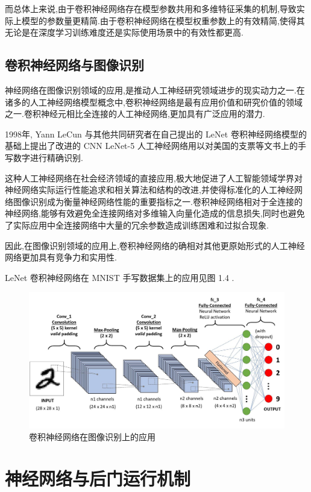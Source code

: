 而总体上来说,由于卷积神经网络存在模型参数共用和多维特征采集的机制,导致实际上模型的参数量更精简.由于卷积神经网络在模型权重参数上的有效精简,使得其无论是在深度学习训练难度还是实际使用场景中的有效性都更高.

\section{卷积神经网络与图像识别}

神经网络在图像识别领域的应用,是推动人工神经研究领域进步的现实动力之一.在诸多的人工神经网络模型概念中,卷积神经网络是最有应用价值和研究价值的领域之一.卷积神经元相比全连接的人工神经网络,更加具有广泛应用的潜力.

1998年, Yann LeCun 与其他共同研究者在自己提出的 LeNet 卷积神经网络模型的基础上提出了改进的 CNN LeNet-5 人工神经网络用以对美国的支票等文书上的手写数字进行精确识别.

这种人工神经网络在社会经济领域的直接应用,极大地促进了人工智能领域学界对神经网络实际运行性能追求和相关算法和结构的改进,并使得标准化的人工神经网络图像识别成为衡量神经网络性能的重要指标之一.卷积神经网络相对于全连接的神经网络,能够有效避免全连接网络对多维输入向量化造成的信息损失,同时也避免了实际应用中全连接网络中大量的冗余参数造成训练困难和过拟合现象.

因此,在图像识别领域的应用上,卷积神经网络的确相对其他更原始形式的人工神经网络更加具有竞争力和实用性.

LeNet 卷积神经网络在 MNIST 手写数据集上的应用见图 1.4 .

\begin{figure}
	\centering
	\includegraphics[scale=0.2]{Figures/CNN2.jpg}
	\caption{卷积神经网络在图像识别上的应用}
\end{figure}

\chapter{神经网络与后门运行机制}


